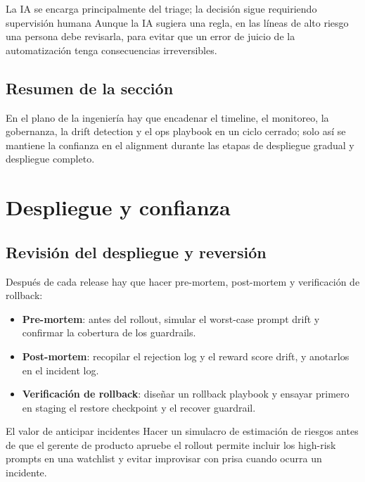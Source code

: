 \documentclass[a4paper]{article}
\begin{document}
\begin{warningbox}{La IA se encarga principalmente del triage; la decisión sigue requiriendo supervisión humana}
Aunque la IA sugiera una regla, en las líneas de alto riesgo una persona debe revisarla, para evitar que un error de juicio de la automatización tenga consecuencias irreversibles.
\end{warningbox}

\subsection{Resumen de la sección}

En el plano de la ingeniería hay que encadenar el timeline, el monitoreo, la gobernanza, la drift detection y el ops playbook en un ciclo cerrado; solo así se mantiene la confianza en el alignment durante las etapas de despliegue gradual y despliegue completo.
\section{Despliegue y confianza}

\subsection{Revisión del despliegue y reversión}

Después de cada release hay que hacer pre-mortem, post-mortem y verificación de rollback:
\begin{itemize}
    \item \textbf{Pre-mortem}: antes del rollout, simular el worst-case prompt drift y confirmar la cobertura de los guardrails.
    \item \textbf{Post-mortem}: recopilar el rejection log y el reward score drift, y anotarlos en el incident log.
    \item \textbf{Verificación de rollback}: diseñar un rollback playbook y ensayar primero en staging el restore checkpoint y el recover guardrail.
\end{itemize}

\begin{importantbox}{El valor de anticipar incidentes}
Hacer un simulacro de estimación de riesgos antes de que el gerente de producto apruebe el rollout permite incluir los high-risk prompts en una watchlist y evitar improvisar con prisa cuando ocurra un incidente.
\end{importantbox}
\end{document}
